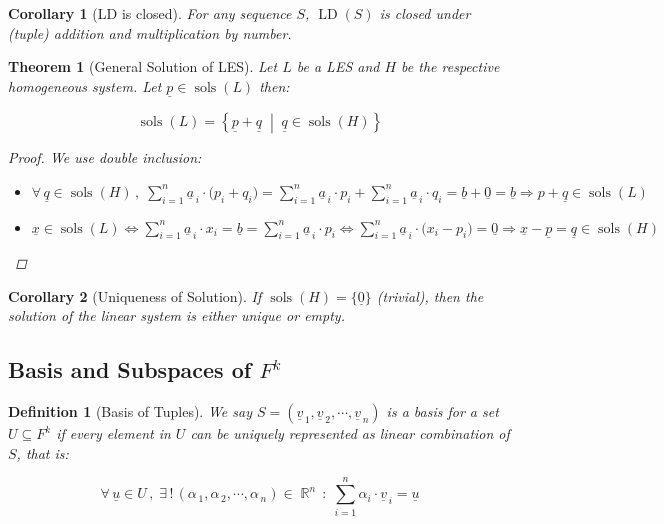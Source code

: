\documentclass[12pt]{article}
\let\RA\Rightarrow
\let\LR\Leftrightarrow
\newcommand{\set}[2]{\left\{{#1}\;\middle|\;{#2}\right\}}
\newcommand{\Forall}[1]{\forall\,{#1}\,,\;}
\newcommand{\Exist}[1]{\exists\,{#1}\,:\;}
\newcommand{\tuple}[1]{\underline{#1}}
\newcommand{\seq}[2]{\left({#1}_{\,1},{#1}_{\,2},\cdots,{#1}_{\,#2}\right)}
\newcommand{\seqt}[2]{\left(\tuple{#1}_{\,1},\tuple{#1}_{\,2},\cdots,\tuple{#1}_{\,#2}\right)}
\DeclareMathOperator{\R}{\mathbb{R}}
\DeclareMathOperator{\sols}{sols}
\DeclareMathOperator{\LD}{LD}
\newtheorem{theorem}{Theorem}[subsection]
\newtheorem{definition}{Definition}[subsection]
\newtheorem{corollary}{Corollary}[subsection]
\begin{document}
\begin{corollary}[LD is closed]
  For any sequence $S$, $\LD(S)$ is closed under (tuple) addition and multiplication by number.
\end{corollary}

\begin{theorem}[General Solution of LES]
  Let $L$ be a LES and $H$ be the respective homogeneous system. Let $\tuple{p}\in\sols(L)$ then:

  $$\sols(L)=\set{\tuple{p}+\tuple{q}}{\tuple{q}\in\sols(H)}$$

  \begin{proof}
    We use double inclusion:
    \begin{itemize}
      \item[$(\supseteq)$] $\displaystyle\Forall{\tuple{q}\in\sols(H)}\sum_{i=1}^n \tuple{a}_{\,i}\cdot \big(p_i+q_i\big)=\sum_{i=1}^n \tuple{a}_{\,i}\cdot p_i+\sum_{i=1}^n \tuple{a}_{\,i}\cdot q_i=\tuple{b}+\tuple{0}=\tuple{b}\RA  p+\tuple{q}\in\sols(L)$ 
      \item[$(\subseteq)$] $\displaystyle\tuple{x}\in\sols(L)\LR \sum_{i=1}^n \tuple{a}_{\,i}\cdot x_i=\tuple{b}=\sum_{i=1}^n \tuple{a}_{\,i}\cdot p_i\LR \sum_{i=1}^n \tuple{a}_{\,i}\cdot \big(x_i-p_i\big)=\tuple{0} \RA \tuple{x}-\tuple{p}=\tuple{q}\in\sols(H)$ 
    \end{itemize}
  \end{proof}
\end{theorem}

\begin{corollary}[Uniqueness of Solution]
  If $\sols(H)=\{\tuple{0}\}$ (trivial), then the solution of the linear system is either unique or empty.
\end{corollary}

\subsection{Basis and Subspaces of $F^k$}

\begin{definition}[Basis of Tuples]
  We say $S=\seqt{v}{n}$ is a basis for a set $U\subseteq F^k$ if every element in $U$ can be uniquely represented as linear combination of $S$, that is:

  $$
  \Forall{\tuple{u}\in U}\Exist{!\,\seq{\alpha}{n}\in\R^n}\sum_{i=1}^n \alpha_i\cdot  \tuple{v}_{\,i} = \tuple{u}
  $$
\end{definition}
\end{document}
